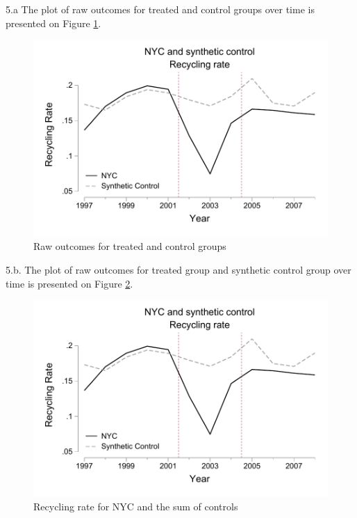\documentclass{article}
\begin{document}
\clearpage
\noindent 5.a The plot of raw outcomes for treated and control groups over time is presented on Figure \ref{fig:raw}.
\begin{figure}[h!]
    \centering
    \includegraphics{homework 9/output/figure/scrawoutcomes.pdf}
    \caption{Raw outcomes for treated and control groups}
    \label{fig:raw}
\end{figure}

\clearpage

\noindent 5.b. The plot of raw outcomes for treated group and synthetic control group over time is presented on Figure \ref{fig:SCcontolvstreated}.
\begin{figure}[h!]
    \centering
    \includegraphics{homework 9/output/figure/sctreatcontrol.pdf}
    \caption{Recycling rate for NYC and the sum of controls}
    \label{fig:SCcontolvstreated}
\end{figure}
\end{document}
